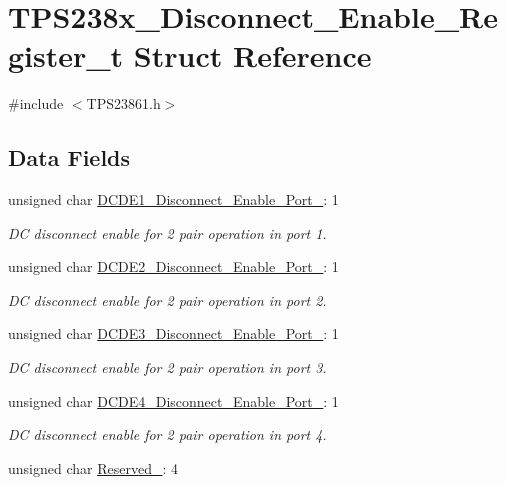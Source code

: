 \hypertarget{struct_t_p_s238x___disconnect___enable___register__t}{\section{T\-P\-S238x\-\_\-\-Disconnect\-\_\-\-Enable\-\_\-\-Register\-\_\-t Struct Reference}
\label{struct_t_p_s238x___disconnect___enable___register__t}
}


{\ttfamily \#include $<$T\-P\-S23861.\-h$>$}

\subsection*{Data Fields}
\begin{DoxyCompactItemize}
\item 
unsigned char \hyperlink{struct_t_p_s238x___disconnect___enable___register__t_a16b9997a3f0d84cb9ab5e38f6a3e8cc6}{D\-C\-D\-E1\-\_\-\-Disconnect\-\_\-\-Enable\-\_\-\-Port\-\_}\-: 1
\begin{DoxyCompactList}\small\item\em D\-C disconnect enable for 2 pair operation in port 1. \end{DoxyCompactList}\item 
unsigned char \hyperlink{struct_t_p_s238x___disconnect___enable___register__t_ac7be429693392634b0c9da86d4683dd9}{D\-C\-D\-E2\-\_\-\-Disconnect\-\_\-\-Enable\-\_\-\-Port\-\_}\-: 1
\begin{DoxyCompactList}\small\item\em D\-C disconnect enable for 2 pair operation in port 2. \end{DoxyCompactList}\item 
unsigned char \hyperlink{struct_t_p_s238x___disconnect___enable___register__t_a49421f01ab97ba27922c5ec05e7d6944}{D\-C\-D\-E3\-\_\-\-Disconnect\-\_\-\-Enable\-\_\-\-Port\-\_}\-: 1
\begin{DoxyCompactList}\small\item\em D\-C disconnect enable for 2 pair operation in port 3. \end{DoxyCompactList}\item 
unsigned char \hyperlink{struct_t_p_s238x___disconnect___enable___register__t_acfff47b6962a2161db69d1918e7dec7d}{D\-C\-D\-E4\-\_\-\-Disconnect\-\_\-\-Enable\-\_\-\-Port\-\_}\-: 1
\begin{DoxyCompactList}\small\item\em D\-C disconnect enable for 2 pair operation in port 4. \end{DoxyCompactList}\item 
unsigned char \hyperlink{struct_t_p_s238x___disconnect___enable___register__t_abd30572716b76b8927166a524bd9e999}{Reserved\-\_}\-: 4
\end{DoxyCompactItemize}



